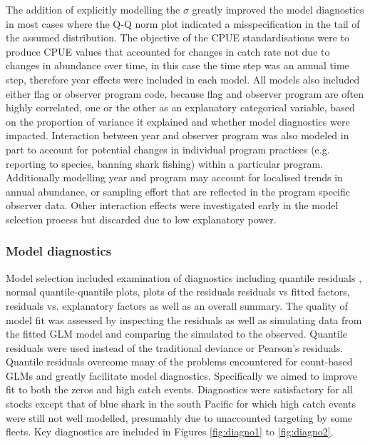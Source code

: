 The addition of explicitly modelling the $\sigma$ greatly improved the  model diagnostics in  most cases where the Q-Q norm plot indicated a misspecification in the tail of the assumed distribution.  The objective of the CPUE standardisations were to produce CPUE values that accounted for changes in catch rate not due to changes in abundance over time, in this case the time step was an annual time step, therefore year effects were included in each model. 
All models also included either flag or observer program code, because flag and observer program are often highly correlated, one or the other as an explanatory categorical variable, based on the proportion of variance it explained and whether model diagnostics were impacted.
Interaction between year and observer program was also modeled in part to account for potential changes in individual program practices (e.g. reporting to species, banning shark fishing) within a particular program.  Additionally modelling year and program may account for localised trends in annual abundance, or sampling effort that are reflected in the program specific observer data. Other interaction effects were investigated early in the model selection process but discarded due to low explanatory power.%
                                                                                    
\subsubsection{Model diagnostics}                                                                                      
Model selection included examination of diagnostics including quantile residuals \citep{Dunn1996_a}, normal quantile-quantile plots, plots of the residuals residuals vs fitted factors, residuals vs. explanatory factors as well as an overall summary.
The quality of model fit was assessed by inspecting the residuals as well as simulating data from the fitted GLM model and comparing the simulated to the observed. Quantile residuals  were used instead of the traditional deviance or Pearson’s residuals. Quantile residuals overcome many of the problems encountered for count-based GLMs and greatly facilitate model diagnostics. Specifically we aimed to improve fit to both the zeros and high catch events. Diagnostics were satisfactory for all stocks except that of blue shark in the south Pacific for which high catch events were still not well modelled, presumably due to unaccounted targeting by some fleets. Key diagnostics are included in Figures \ref{fig:diagno1} to \ref{fig:diagno2}.


